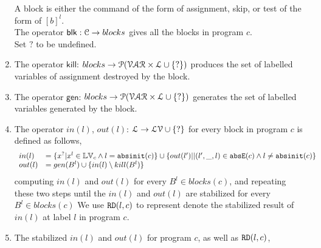\begin{enumerate}
A block  is either the command of the form of assignment, skip, or test of the form of $[b]^{l}$.\\
The operator $\mathsf{blk} : \mathcal{C} \to blocks$ gives all the blocks in program $c$.
\\
 Set $?$ to be undefined.
\item The operator $\mathsf{kill}$: $blocks \to \mathcal{P}(\mathcal{VAR} \times \mathcal{L} \cup \{?\})$ produces the set of labelled variables of assignment destroyed by the block.
\item  The operator $\mathsf{gen}$: $blocks \to \mathcal{P}(\mathcal{VAR} \times \mathcal{L} \cup \{?\})$ generates the set of labelled variables generated by the block.
\item The operator  $in(l)$, $out(l)$: $ \mathcal{L} \to \mathcal{LV} \cup \{?\}$ for every block in program $c$ is defined as follows,
 \[
 \begin{array}{ll}
    in(l)  & = \{ x^{?} | x^l \in \mathbb{LV}_c \land  l = \mathtt{abs}{\mathtt{init}}(c) \}  
    \cup \{ out(l')|  | (l',\_, l) \in \mathtt{abs}{\mathtt{E}}(c) \land  l \neq \mathtt{abs}{\mathtt{init}}(c)\}  \\
     out(l)  & =  gen(B^{l}) \cup \{ in(l) \setminus kill(B^l)  \}  
 \end{array}
 \]
computing $in(l)$ and $out(l)$ for every $B^l \in blocks(c) $, and repeating these two steps
until the $in(l)$ and $out(l)$ are stabilized for every $B^l \in blocks(c) $
We use $\mathtt{RD}(l,c)$ to represent 
denote the stabilized result of $in(l)$ at label $l$ in program $c$. 
\\
\item The stabilized $in(l)$ and $out(l)$ for program $c$, as well as $\mathtt{RD}(l, c)$,

\end{enumerate}
